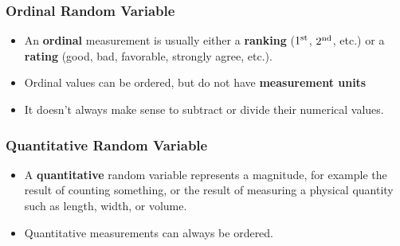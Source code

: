 \begin{frame}\frametitle{Ordinal Random Variable}

\begin{itemize}
\item An {\bf ordinal} measurement is usually either a {\bf ranking}
($1^{\rm st}$, $2^{\rm nd}$, etc.) or a {\bf rating} (good, bad,
favorable, strongly agree, etc.).  

\item Ordinal values can be ordered, but do not have {\bf measurement units}
\item It doesn't always make sense to subtract or divide their numerical
values.
\end{itemize}
\end{frame}

\begin{frame}\frametitle{Quantitative Random Variable}

\begin{itemize}
\item A {\bf quantitative} random variable represents a magnitude, for
example the result of counting something, or the result of measuring a
physical quantity such as length, width, or volume.

\item Quantitative measurements can always be ordered.
\end{itemize}
\end{frame}

%
%
%

